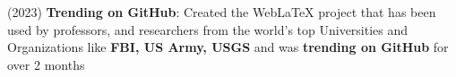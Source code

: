 (2023) \textbf{Trending on GitHub}{: Created the WebLaTeX project that has been used by professors, and researchers from the world's top Universities
 and Organizations like \textbf{FBI, US Army, USGS} and was \textbf{trending on GitHub} for over 2 months} \\